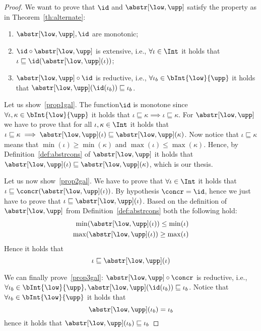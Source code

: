 \begin{proof}
  We want to prove that \(\id\) and \(\abstr[\low,\upp]\) satisfy the
  property as in Theorem~\ref{th:alternate}:
  \begin{enumerate}[label=(\arabic*)]
  \item\label{prop1gal} \(\abstr[\low,\upp], \id\) are monotonic;
  \item\label{prop2gal} \(\id \circ \abstr[\low, \upp]\) is
    extensive, i.e., \(\forall \iota \in \Int\) it holds that
    \(\iota \sqsubseteq \id(\abstr[\low, \upp](\iota))\);
    
  \item\label{prop3gal} \(\abstr[\low,\upp] \circ \id\) is reductive,
    i.e., \(\forall \iota_b \in \bInt{\low}{\upp}\) it holds that
    \(\abstr[\low, \upp](\id(\iota_b)) \sqsubseteq \iota_b\).
  \end{enumerate}

  \medskip

  \noindent
  Let us show~\ref{prop1gal}. The function\(\id\) is monotone since
  \(\forall \iota, \kappa \in \bInt{\low}{\upp}\) it holds that
  \(\iota \sqsubseteq \kappa \implies \iota \sqsubseteq \kappa\). For
  \(\abstr[\low,\upp]\) we have to prove that for all
  \(\iota, \kappa \in \Int\) it holds that
  \(\iota \sqsubseteq \kappa \implies \abstr[\low,\upp](\iota)
  \sqsubseteq \abstr[\low,\upp](\kappa)\). Now notice that
  \(\iota \sqsubseteq \kappa \) means that
  \(\min(\iota) \geq \min(\kappa)\) and
  \(\max(\iota) \leq \max(\kappa)\). Hence, by
  Definition~\ref{def:abstrcons} of \(\abstr[\low, \upp]\) it holds that
  \(\abstr[\low, \upp](\iota) \sqsubseteq \abstr[\low, \upp](\kappa)\),
  which is our thesis.

  \medskip

  \noindent
  Let us now show~\ref{prop2gal}. We have to prove that
  \(\forall \iota \in \Int\) it holds that
  \(\iota \sqsubseteq \concr(\abstr[\low,\upp](\iota))\). By hypothesis
  \(\concr = \id\), hence we just have to prove that
  \(\iota \sqsubseteq \abstr[\low, \upp](\iota)\). Based on the
  definition of \(\abstr[\low, \upp]\) from
  Definition~\ref{def:abstrcons} both the following hold:
  \begin{align*}
    \min(\abstr[\low,\upp](\iota)) \leq \min(\iota) \\
    \max(\abstr[\low,\upp](\iota)) \geq \max(\iota)
  \end{align*}
  Hence it holds that
  \begin{equation}
    \iota \sqsubseteq \abstr[\low, \upp](\iota)
  \end{equation}

  \medskip

  \noindent
  We can finally prove~\ref{prop3gal}:
  \(\abstr[\low, \upp] \circ \concr\) is reductive, i.e.,
  \(\forall \iota_b \in \bInt{\low}{\upp}, \abstr[\low,\upp](\id(\iota_b))
  \sqsubseteq \iota_b\).  Notice that
  \(\forall \iota_b \in \bInt{\low}{\upp}\) it holds that
  \begin{equation}\label{eq:injection}
    \abstr[\low,\upp](\iota_b) = \iota_b
  \end{equation}
  hence it holds that \(\abstr[\low,\upp](\iota_b) \sqsubseteq \iota_b\)
\end{proof}

